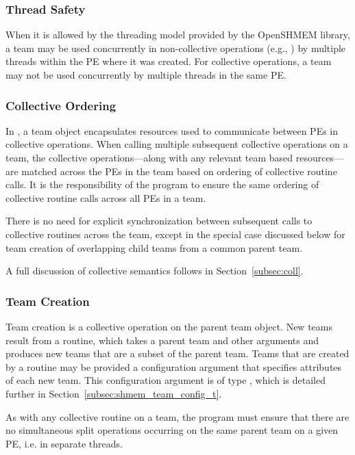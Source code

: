 \subsubsection*{Thread Safety}

When it is allowed by the threading model provided by the OpenSHMEM
library, a team may be used concurrently in non-collective operations
(e.g., ) by multiple threads within the
\ac{PE} where it was created.
For collective operations, a team may not be used concurrently by
multiple threads in the same \ac{PE}.

\subsubsection*{Collective Ordering}

In \openshmem, a team object encapsulates resources used to communicate
between \acp{PE} in collective operations. When calling multiple subsequent
collective operations on a team, the collective operations---along with any
relevant team based resources---are matched across the \acp{PE} in the team
based on ordering of collective routine calls. It is the responsibility
of the \openshmem program to ensure the same ordering of collective routine calls
across all \acp{PE} in a team.

There is no need for explicit synchronization between subsequent calls
to collective routines across the team, except in the special case discussed
below for team creation of overlapping child teams from a common parent team.

A full discussion of collective semantics follows in Section~\ref{subsec:coll}.

\subsubsection*{Team Creation}

Team creation is a collective operation on the parent team object. New teams
result from a  routine, which takes a parent team
and other arguments and produces new teams that are a subset of the parent
team. Teams that are created by a  routine may be
provided a configuration argument that specifies attributes of each new team.
This configuration argument is of type , which
is detailed further in Section~\ref{subsec:shmem_team_config_t}.

As with any collective routine on a team, the program must ensure that there
are no simultaneous split operations occurring on the same parent team on a
given \ac{PE}, i.e. in separate threads.

